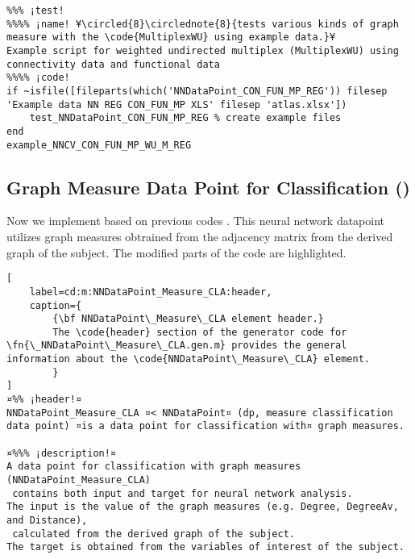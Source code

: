 \documentclass{tufte-handout}
\begin{document}
\begin{lstlisting}
%%% ¡test!
%%%% ¡name! ¥\circled{8}\circlednote{8}{tests various kinds of graph measure with the \code{MultiplexWU} using example data.}¥
Example script for weighted undirected multiplex (MultiplexWU) using connectivity data and functional data
%%%% ¡code!
if ~isfile([fileparts(which('NNDataPoint_CON_FUN_MP_REG')) filesep 'Example data NN REG CON_FUN_MP XLS' filesep 'atlas.xlsx'])
    test_NNDataPoint_CON_FUN_MP_REG % create example files
end
example_NNCV_CON_FUN_MP_WU_M_REG

\end{lstlisting}

\clearpage
\subsection{Graph Measure Data Point for Classification ()}

Now we implement  based on previous codes .
This neural network datapoint utilizes graph measures obtrained from the adjacency matrix from the derived graph of the subject. 
The modified parts of the code are highlighted.

\begin{lstlisting}[
	label=cd:m:NNDataPoint_Measure_CLA:header,
	caption={
		{\bf NNDataPoint\_Measure\_CLA element header.}
		The \code{header} section of the generator code for \fn{\_NNDataPoint\_Measure\_CLA.gen.m} provides the general information about the \code{NNDataPoint\_Measure\_CLA} element.
		}
]
¤%% ¡header!¤
NNDataPoint_Measure_CLA ¤< NNDataPoint¤ (dp, measure classification data point) ¤is a data point for classification with¤ graph measures.

¤%%% ¡description!¤
A data point for classification with graph measures (NNDataPoint_Measure_CLA) 
 contains both input and target for neural network analysis.
The input is the value of the graph measures (e.g. Degree, DegreeAv, and Distance), 
 calculated from the derived graph of the subject.
The target is obtained from the variables of interest of the subject.
\end{lstlisting}
\end{document}
